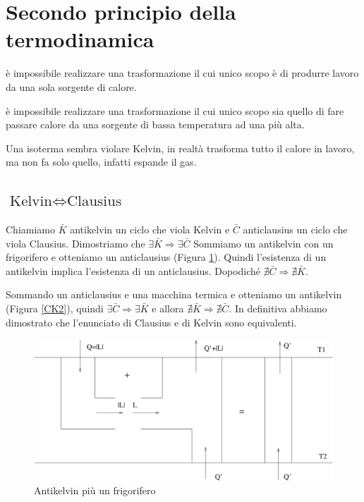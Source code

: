 \section{Secondo principio della termodinamica}

\begin{Pri}
è impossibile realizzare una trasformazione il cui unico scopo è di produrre lavoro da una sola sorgente di calore.
\end{Pri}

\begin{Pri}
è impossibile realizzare una trasformazione il cui unico scopo sia quello di fare passare calore da una sorgente di bassa temperatura ad una più alta.
\end{Pri}

Una isoterma sembra violare Kelvin, in realtà trasforma tutto il calore in lavoro, ma non fa solo quello, infatti espande il gas.
\subsection{\texorpdfstring{$\text{Kelvin}\Leftrightarrow\text{Clausius}$}{Kelvin <=> Clausius}}

Chiamiamo $\bar{K}$ antikelvin un ciclo che viola Kelvin e $\bar{C}$ anticlausius un ciclo che viola Clausius. Dimostriamo che $\exists\bar{K}\Rightarrow\exists\bar{C}$ Sommiamo un antikelvin con un frigorifero e otteniamo un anticlausius (Figura \ref{CK1}). Quindi l'esistenza di un antikelvin implica l'esistenza di un anticlausius. Dopodiché $\nexists\bar{C}\Rightarrow\nexists\bar{K}$.

Sommando un anticlausius e una macchina termica e otteniamo un antikelvin (Figura \ref{CK2}), quindi
 $\exists\bar{C}\Rightarrow\exists\bar{K}$ e allora $\nexists\bar{K}\Rightarrow\nexists\bar{C}$. In definitiva abbiamo dimostrato che l'enunciato di Clausius e di Kelvin sono equivalenti.
\begin{figure}[htbp]
\centering
\includegraphics[scale=0.5]{immagini/fisica1/AK+Frigo}
\caption{Antikelvin più un frigorifero}
\label{CK1}
\end{figure}

